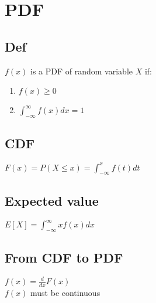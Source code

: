 \section{PDF}
    \subsection*{Def}
        $f(x)$ is a PDF of random variable $X$ if:
        \begin{enumerate}
            \item $f(x) \geq 0$
            \item $\int_{-\infty}^{\infty} f(x) dx = 1$
        \end{enumerate}

    \subsection*{CDF}
        $F(x)=P(X \leq x)=\int_{-\infty}^{x} f(t) dt$

    \subsection*{Expected value}
        $E[X] = \int_{-\infty}^{\infty} xf(x) dx$
    
    \subsection*{From CDF to PDF}
        $f(x) = \frac{d}{dx} F(x)$\\
        $f(x)$ must be continuous